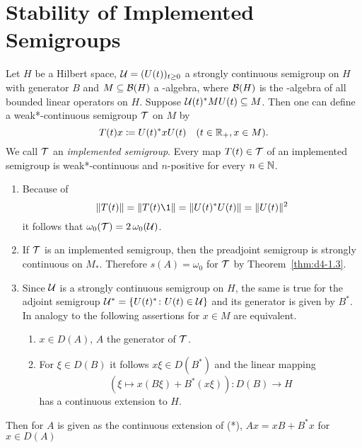\section{Stability of Implemented Semigroups}
Let $H$ be a Hilbert space, $\mathcal{U} = (U(t))_{t \geq 0}$ a strongly continuous semigroup on $H$ with generator $B$ and $M \subseteq \mathcal{B}(H)$ a \WA-algebra, where $\mathcal{B}(H)$ is the \WA-algebra of all bounded linear operators on $H$.
Suppose $\mathcal{U}(t)^{*}MU(t) \subseteq M$.
Then one can define a weak*-continuous semigroup $\mathcal{T}$ on $M$ by 
%
\[
	T(t)x \coloneqq U(t)^{*}xU(t) \quad (t \in \mathbb{R}_{+}, x \in M) .
\]
%
We call $\mathcal{T}$ an \emph{implemented semigroup}.
Every map $T(t) \in \mathcal{T}$ of an implemented semigroup is weak*-continuous and $n$-positive for every $n \in \mathbb{N}$.
\begin{remarks}\label{rem:d4-2.1}

\begin{enumerate}[\upshape (i), wide, labelindent=.5em]
\item\label{item:d4-2.1-i}
Because of
\[
	\|T(t)\| = \|T(t)\1\| = \|U(t)^{*}U(t)\| = \|U(t)\|^2
\]
it follows that $\omega_{0}(\mathcal{T}) = 2\,\omega_{0}(\mathcal{U})$.

\item\label{item:d4-2.1-ii}
If $\mathcal{T}$ is an implemented semigroup, then the preadjoint semigroup is strongly continuous on $M_{*}$.
Therefore $s(A) = \omega_{0}$ for $\mathcal{T}$ by Theorem~\ref{thm:d4-1.3}.

\item\label{item:d4-2.1-iii}
Since $\mathcal{U}$ is a strongly continuous semigroup on $ H $, the same is true for the adjoint semigroup 
$\mathcal{U}^{*} = \{ U(t)^{*} \colon U(t) \in \mathcal{U} \}$ and its generator is given by $B^{*}$.
In analogy to \citet[3.2.55]{brattelirobinson:1979} the following assertions for $x \in M$ are equivalent.
\begin{enumerate}[\upshape (a)]
\item
$x \in D(A)$, $ A $ the generator of $ \mathcal{T} $.

\item
For $\xi \in D(B)$ it follows $x\xi \in D(B^{*})$ and the linear mapping
\begin{equation}
	(\xi \mapsto x(B\xi)+B^{*}(x\xi)): D(B) \to H \tag{*}
\end{equation}
has a continuous extension to $H$.
\end{enumerate}
\end{enumerate}
\end{remarks}
Then for $A$ is given as the continuous extension of (*), \ie 
 $Ax = xB + B^{*}x$ for $ x \in D(A) $


